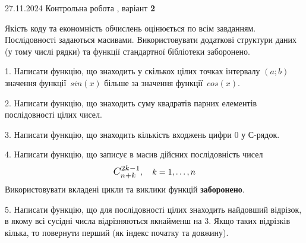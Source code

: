 \documentclass[12pt, ukrainian]{article}
\begin{document}
{\begin {large}
\end{large}
\vspace{35mm}


{{27.11.2024 Контрольна робота , варіант  \No \textbf { 2 }\par}}


{
Якість коду та економність обчислень оцінюється по всім завданням. Послідовності задаються масивами. Використовувати додаткові структури даних (у тому числі рядки) та функції стандартної бібліотеки заборонено.

\vspace{2mm}

\begin {large}
1. Написати функцію, що знаходить у скількох цілих точках інтервалу $(a; b)$ значення функції~$sin(x)$ більше за значення функції~$cos(x)$.

\vspace{2mm}


2. Написати функцію, що знаходить суму квадратів парних елементів послідовності цілих чисел.

\vspace{2mm}


3. Написати функцію, що знаходить кількість входжень цифри 0 у С-рядок.

\vspace{2mm}


4. 
Написати функцію, що записує в масив дійсних послідовність чисел
$$\scalebox{1.2}{$C_{n+k}^{2k-1}$}, \quad k=1,\ldots,n$$
Використовувати вкладені цикли та виклики функцій \textbf{заборонено}.

\vspace{2mm}


5. Написати функцію, що для послідовності цілих знаходить найдовший відрізок, в якому всі сусідні числа відрізняються якнайменш на 3. Якщо таких відрізків кілька, то повернути перший (як індекс початку та довжину).

\vspace{2mm}


\end{large}}}
\end{document}

